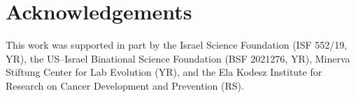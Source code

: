 \documentclass[12pt]{extarticle}
\begin{document}
{\small
\section*{Acknowledgements}
This work was supported in part by
the Israel Science Foundation (ISF 552/19, YR),
the US–Israel Binational Science Foundation (BSF 2021276, YR), 
Minerva Stiftung Center for Lab Evolution (YR), 
and the Ela Kodesz Institute for Research on Cancer Development and Prevention (RS).
}

\nolinenumbers
%



\end{document}
